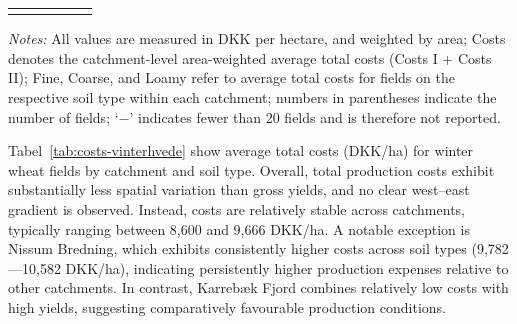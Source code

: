 \documentclass[12pt]{article}
\begin{document}
\begin{table}[H]
\begin{threeparttable}
\begin{tabular}{lrrrrr}
\addlinespace\bottomrule
\end{tabular}
\begin{tablenotes}
\footnotesize
\item \textit{Notes:} All values are measured in DKK per hectare, and weighted by area;
Costs denotes the catchment-level area-weighted average total costs (Costs I + Costs II);
Fine, Coarse, and Loamy refer to average total costs for fields on the respective
soil type within each catchment; numbers in parentheses indicate the number of
fields; `$-$' indicates fewer than 20 fields and is therefore not reported.
\end{tablenotes}
\end{threeparttable}
\end{table}



Tabel~\ref{tab:costs-vinterhvede} show average total costs (DKK/ha) for winter wheat fields by catchment and soil type. Overall, total production costs exhibit substantially less spatial variation than gross yields, and no clear west–east gradient is observed. Instead, costs are relatively stable across catchments, typically ranging between 8,600 and 9,666 DKK/ha. A notable exception is Nissum Bredning, which exhibits consistently higher costs across soil types (9,782---10,582 DKK/ha), indicating persistently higher production expenses relative to other catchments. In contrast, Karrebæk Fjord combines relatively low costs with high yields, suggesting comparatively favourable production conditions.
\end{document}
